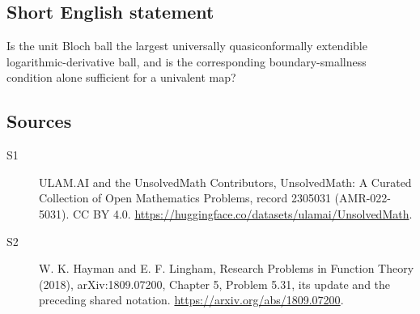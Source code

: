 \documentclass[11pt]{article}
\begin{document}
\subsection{Short English statement}
Is the unit Bloch ball the largest universally quasiconformally extendible logarithmic-derivative ball, and is the corresponding boundary-smallness condition alone sufficient for a univalent map?
\subsection{Sources}
\begin{description}
\item[\hypertarget{source:2305031:1}{S1}] ULAM.AI and the UnsolvedMath Contributors, UnsolvedMath: A Curated Collection of Open Mathematics Problems, record 2305031 (AMR-022-5031). CC BY 4.0. \url{https://huggingface.co/datasets/ulamai/UnsolvedMath}.
\item[\hypertarget{source:2305031:2}{S2}] W. K. Hayman and E. F. Lingham, Research Problems in Function Theory (2018), arXiv:1809.07200, Chapter 5, Problem 5.31, its update and the preceding shared notation. \url{https://arxiv.org/abs/1809.07200}.
\end{description}
\label{end:2305031}
\end{document}

